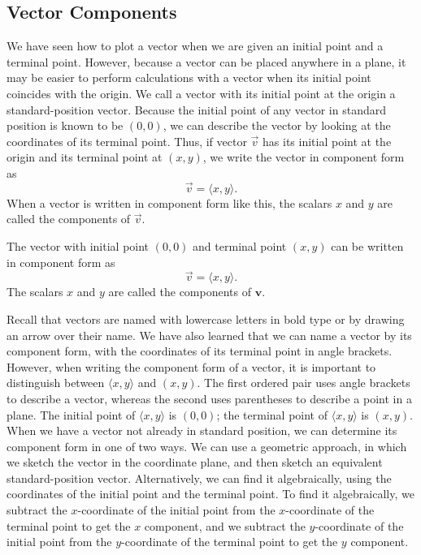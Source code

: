 \documentclass{report}
\begin{document}
    \subsection{Vector Components}
    \bigbreak \noindent 
    We have seen how to plot a vector when we are given an initial point and a terminal point. However, because a vector can be placed anywhere in a plane, it may be easier to perform calculations with a vector when its initial point coincides with the origin. We call a vector with its initial point at the origin a standard-position vector. Because the initial point of any vector in standard position is known to be $(0,0)$, we can describe the vector by looking at the coordinates of its terminal point. Thus, if vector $\vec{v}$ has its initial point at the origin and its terminal point at $(x,y)$, we write the vector in component form as
    \[
        \vec{v} = \langle x, y \rangle.
    \]
    When a vector is written in component form like this, the scalars $x$ and $y$ are called the components of $\vec{v}$.
    \bigbreak \noindent
    \begin{dfn}
        The vector with initial point $(0,0)$ and terminal point $(x,y)$ can be written in component form as
        \[
            \vec{v} = \langle x, y \rangle.
        \]
        The scalars $x$ and $y$ are called the components of $\mathbf{v}$.
    \end{dfn}
    \bigbreak \noindent 
    Recall that vectors are named with lowercase letters in bold type or by drawing an arrow over their name. We have also learned that we can name a vector by its component form, with the coordinates of its terminal point in angle brackets. However, when writing the component form of a vector, it is important to distinguish between $\langle x, y \rangle$ and $(x, y)$. The first ordered pair uses angle brackets to describe a vector, whereas the second uses parentheses to describe a point in a plane. The initial point of $\langle x, y \rangle$ is $(0,0)$; the terminal point of $\langle x, y \rangle$ is $(x, y)$.
    \bigbreak \noindent 
    When we have a vector not already in standard position, we can determine its component form in one of two ways. We can use a geometric approach, in which we sketch the vector in the coordinate plane, and then sketch an equivalent standard-position vector. Alternatively, we can find it algebraically, using the coordinates of the initial point and the terminal point. To find it algebraically, we subtract the $x$-coordinate of the initial point from the $x$-coordinate of the terminal point to get the $x$ component, and we subtract the $y$-coordinate of the initial point from the $y$-coordinate of the terminal point to get the $y$ component.
\end{document}
